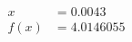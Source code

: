 \documentclass[preview]{standalone}
\begin{document}
\begin{align*}
x &= 0.0043\\f(x) &= 4.0146055
\end{align*}
\end{document}
